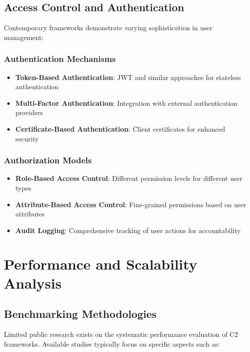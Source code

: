 \subsection{Access Control and Authentication}
\label{subsec:access_control}

Contemporary frameworks demonstrate varying sophistication in user management:

\subsubsection{Authentication Mechanisms}

\begin{itemize}
\item \textbf{Token-Based Authentication}: JWT and similar approaches for stateless authentication
\item \textbf{Multi-Factor Authentication}: Integration with external authentication providers
\item \textbf{Certificate-Based Authentication}: Client certificates for enhanced security
\end{itemize}

\subsubsection{Authorization Models}

\begin{itemize}
\item \textbf{Role-Based Access Control}: Different permission levels for different user types
\item \textbf{Attribute-Based Access Control}: Fine-grained permissions based on user attributes
\item \textbf{Audit Logging}: Comprehensive tracking of user actions for accountability
\end{itemize}

\section{Performance and Scalability Analysis}
\label{sec:performance_analysis}

\subsection{Benchmarking Methodologies}
\label{subsec:benchmarking}

Limited public research exists on the systematic performance evaluation of C2 frameworks. Available studies typically focus on specific aspects such as:


